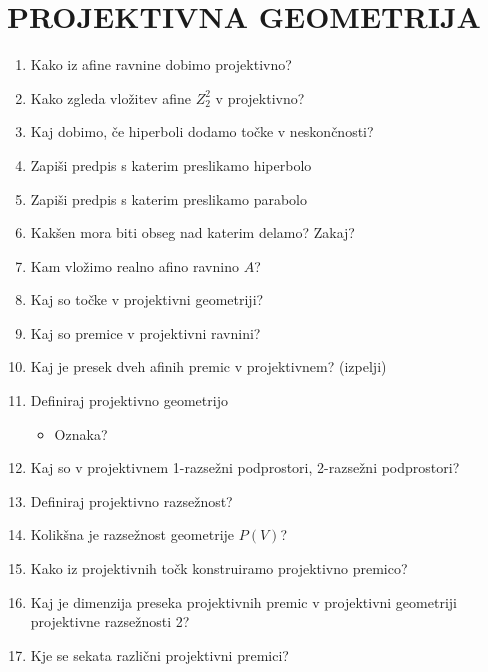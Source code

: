 \documentclass{article}
\begin{document}
    \section{PROJEKTIVNA GEOMETRIJA}
    \begin{enumerate}
        \item Kako iz afine ravnine dobimo projektivno?
        \item Kako zgleda vložitev afine $Z^2_2$ v projektivno?
        \item Kaj dobimo, če hiperboli dodamo točke v neskončnosti?
        \item Zapiši predpis s katerim preslikamo hiperbolo
        \item Zapiši predpis s katerim preslikamo parabolo
        \item Kakšen mora biti obseg nad katerim delamo? Zakaj?
        \item Kam vložimo realno afino ravnino $A$?
        \item Kaj so točke v projektivni geometriji?
        \item Kaj so premice v projektivni ravnini?
        \item Kaj je presek dveh afinih premic v projektivnem? (izpelji)
        \item Definiraj projektivno geometrijo
        \begin{itemize}
            \item Oznaka?
        \end{itemize}
        \item Kaj so v projektivnem 1-razsežni podprostori, 2-razsežni podprostori?
        \item Definiraj projektivno razsežnost?
        \item Kolikšna je razsežnost geometrije $P(V)$?
        \item Kako iz projektivnih točk konstruiramo projektivno premico?
        \item Kaj je dimenzija preseka projektivnih premic v projektivni geometriji projektivne razsežnosti 2?
        \item Kje se sekata različni projektivni premici?
    \end{enumerate}
\end{document}
